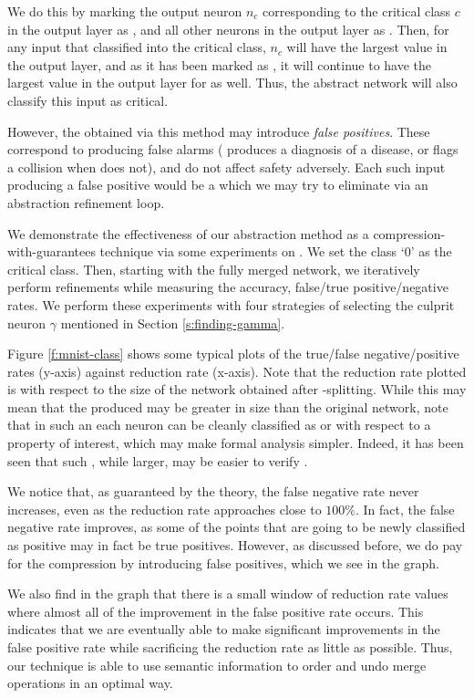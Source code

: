 We do this by marking the output neuron $n_c$ corresponding to the critical
class $c$ in the output layer as \inc, and all other neurons in the output layer
as \dec.  Then, for any input that \cnc classified into
the critical class, $n_c$ will have the largest value in the
output layer, and as it has been marked as \inc, it will continue to have the
largest value in the output layer for \abs as well. Thus, the
abstract network will also classify this input as critical. 

However, the \abs obtained via this method may introduce
\emph{false positives}. These correspond to producing false alarms (\abs
produces a diagnosis of a disease, or flags a collision when \cnc does not), and
do not affect safety adversely. Each such input producing a false positive
would be a \gencex which we may try to eliminate via an abstraction refinement
loop.

We demonstrate the effectiveness of our abstraction method as a
compression-with-guarantees technique via some experiments on \mnist. We set the
class `0' as the critical class. Then, starting with the fully merged network,
we iteratively perform refinements while measuring the accuracy, false/true
positive/negative rates. We perform these experiments with four strategies of
selecting the culprit neuron $\gamma$ mentioned in Section
\ref{s:finding-gamma}.

Figure \ref{f:mnist-class} shows some typical plots of the true/false
negative/positive rates (y-axis) against reduction rate (x-axis). Note that the
reduction rate plotted is with respect to the size of the network obtained after
\inc-\dec splitting. While this may mean that the \abs produced may be greater
in size than the original network, note that in such an \abs each neuron can be
cleanly classified as \inc or \dec with respect to a property of interest, which
may make formal analysis simpler. Indeed, it has been seen that such \abs, while
larger, may be easier to verify \cite{cegar-nn}. 

We notice that, as guaranteed by the theory, the false negative rate never
increases, even as the reduction rate approaches close to $100\%$. In fact, the
false negative rate improves, as some of the points that are going
to be newly classified as positive may in fact be true positives.  
However, as discussed before, we do pay for the compression by introducing false
positives, which we see in the graph. 

We also find in the graph that there is a
small window of reduction rate values where almost all of the improvement in the
false positive rate occurs. This indicates that we are eventually able to make 
significant improvements in the false positive rate while sacrificing the
reduction rate as little as possible. Thus, our technique is able to use
semantic information to order and undo merge operations in an optimal way.

